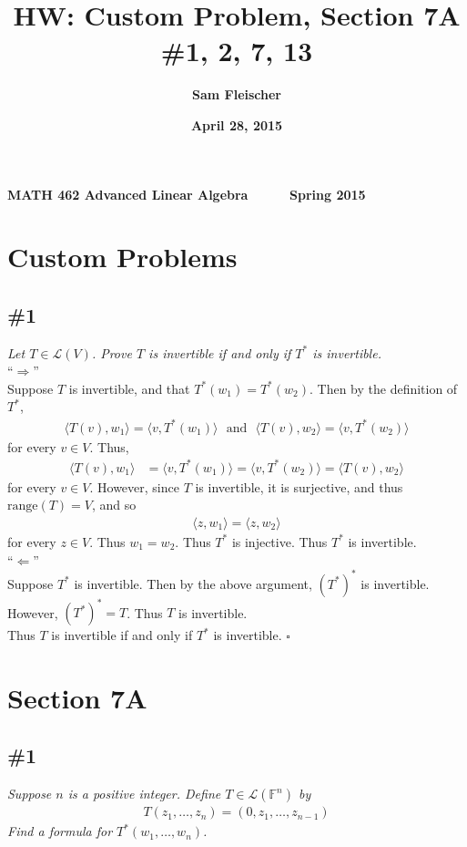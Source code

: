 \documentclass[12pt]{article}
\title{\bf HW: Custom Problem, Section 7A \#1, 2, 7, 13}
\author{\bf Sam Fleischer}
\date{\bf April 28, 2015}
\newcommand{\VECTOR}[1]{\langle #1 \rangle}
\begin{document}
{\bf MATH 462 \hfill Advanced Linear Algebra \ \ \ \ \ \hfill Spring 2015} 

{\let\newpage\relax\maketitle}

\section*{Custom Problems}
\subsection*{\#1}
{\it Let $T \in \mathcal{L}(V)$.  Prove $T$ is invertible if and only if $T^*$ is invertible.} \\

\noindent ``$\Longrightarrow$'' \\
Suppose $T$ is invertible, and that $T^*(w_1) = T^*(w_2)$.  Then by the definition of $T^*$,
\begin{align*}
	\VECTOR{T(v), w_1} = \VECTOR{v, T^*(w_1)} \ \ \ \text{and}\ \ \ \VECTOR{T(v), w_2} = \VECTOR{v, T^*(w_2)}
\end{align*}
for every $v \in V$.  Thus,
\begin{align*}
	\VECTOR{T(v), w_1} &= \VECTOR{v, T^*(w_1)} = \VECTOR{v, T^*(w_2)} = \VECTOR{T(v), w_2}
\end{align*}
for every $v \in V$.  However, since $T$ is invertible, it is surjective, and thus $\text{range}(T) = V$, and so 
\begin{align*}
	\VECTOR{z, w_1} = \VECTOR{z, w_2}
\end{align*}
for every $z \in V$.  Thus $w_1 = w_2$.  Thus $T^*$ is injective.  Thus $T^*$ is invertible. \\

\noindent ``$\Longleftarrow$'' \\
Suppose $T^*$ is invertible.  Then by the above argument, $(T^*)^*$ is invertible.  However, $(T^*)^* = T$.  Thus $T$ is invertible. \\

\noindent Thus $T$ is invertible if and only if $T^*$ is invertible. \hfill $\square$

\section*{Section 7A}
\subsection*{\#1}
{\it Suppose $n$ is a positive integer.  Define $T \in \mathcal{L}(\mathbb{F}^n)$ by}
\begin{align*}
	T(z_1, \dots, z_n) = (0, z_1, \dots, z_{n-1})
\end{align*}
{\it Find a formula for $T^*(w_1, \dots, w_n)$.} \\
\end{document}
